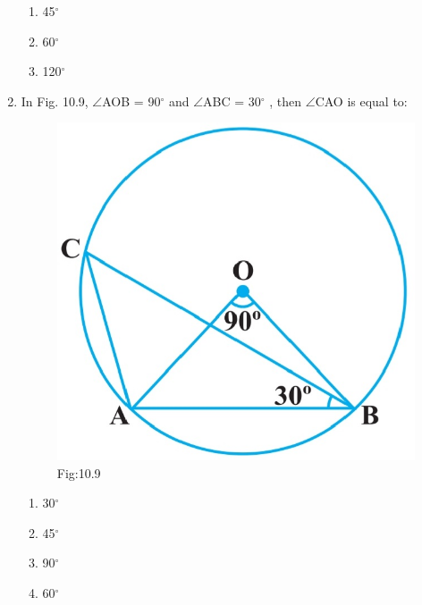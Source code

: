 \documentclass{article}
\begin{document}
\begin{enumerate}
\begin{enumerate}
\item 45$^{\circ}$
\item 60$^{\circ}$
\item 120$^{\circ}$
\end{enumerate}
\item In Fig. 10.9, $\angle$AOB = 90$^{\circ}$ and $\angle$ABC = 30$^{\circ}$ , then $\angle$CAO is equal to:                              
\begin{figure}[H]
\centering
\includegraphics[width=\columnwidth]{Figs/10.9.jpg}
\caption*{Fig:10.9}
\end{figure}
\begin{enumerate}
\item 30$^{\circ}$
\item 45$^{\circ}$
\item 90$^{\circ}$
\item 60$^{\circ}$
\end{enumerate}
\end{enumerate}
\end{document}

